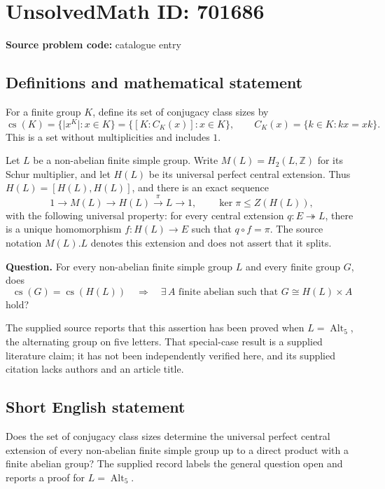 \documentclass[11pt]{article}
\newcommand{\Z}{\mathbb{Z}}
\begin{document}
\section*{UnsolvedMath ID: 701686}
\textbf{Source problem code:} catalogue entry
\subsection{Definitions and mathematical statement}
For a finite group \(K\), define its set of conjugacy class sizes by
\[
\operatorname{cs}(K)=\{\lvert x^K\rvert:x\in K\}
=\{[K:C_K(x)]:x\in K\},
\qquad C_K(x)=\{k\in K:kx=xk\}.
\]
This is a set without multiplicities and includes \(1\).

Let \(L\) be a non-abelian finite simple group. Write \(M(L)=H_2(L,\Z)\) for its Schur multiplier, and let \(H(L)\) be its universal perfect central extension. Thus \(H(L)=[H(L),H(L)]\), and there is an exact sequence
\[
1\longrightarrow M(L)\longrightarrow H(L)\xrightarrow{\pi}L\longrightarrow 1,
\qquad \ker\pi\leq Z(H(L)),
\]
with the following universal property: for every central extension \(q:E\twoheadrightarrow L\), there is a unique homomorphism \(f:H(L)\to E\) such that \(q\circ f=\pi\). The source notation \(M(L).L\) denotes this extension and does not assert that it splits.

\textbf{Question.} For every non-abelian finite simple group \(L\) and every finite group \(G\), does
\[
\operatorname{cs}(G)=\operatorname{cs}(H(L))
\quad\Longrightarrow\quad
\exists\,A\text{ finite abelian such that }G\cong H(L)\times A
\]
hold?

The supplied source reports that this assertion has been proved when \(L=\operatorname{Alt}_5\), the alternating group on five letters. That special-case result is a supplied literature claim; it has not been independently verified here, and its supplied citation lacks authors and an article title.
\subsection{Short English statement}
Does the set of conjugacy class sizes determine the universal perfect central extension of every non-abelian finite simple group up to a direct product with a finite abelian group? The supplied record labels the general question open and reports a proof for \(L=\operatorname{Alt}_5\).
\end{document}
